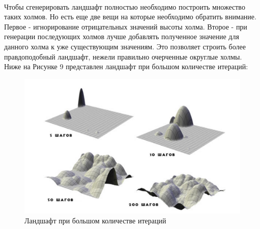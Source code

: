 \documentclass[a4paper, 10pt]{article}
\begin{document}
	\\ \hspace*{5mm} Чтобы сгенерировать ландшафт полностью необходимо построить множество таких холмов. Но есть еще две вещи на которые необходимо обратить внимание. Первое - игнорирование отрицательных значений высоты холма. Второе - при генерации последующих холмов лучше добавлять полученное значение для данного холма к уже существующим значениям. Это позволяет строить более правдоподобный ландшафт, нежели правильно очерченные округлые холмы. Ниже на Рисунке 9 представлен ландшафт при большом количестве итераций:
	\clearpage
	\newpage
	\begin{figure}[h!]
		\centering
		\includegraphics[scale=0.8]{steps}
		\centering\caption{Ландшафт при большом количестве итераций}
	\end{figure}
	
\end{document}
